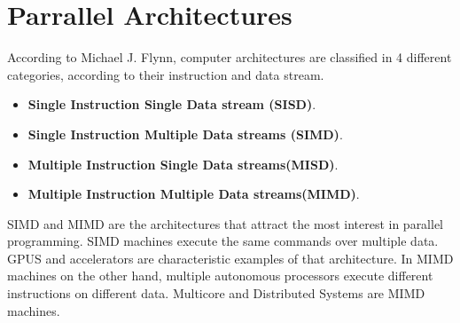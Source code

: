 \section{Parrallel Architectures}
According to Michael J. Flynn, computer architectures are classified in 4 different categories, according to their instruction and data stream. 


\begin{itemize}
	\item
	\textbf{Single Instruction Single Data stream (SISD)}. 

	\item
	\textbf{Single Instruction Multiple Data streams (SIMD)}.

	\item
	\textbf{Multiple Instruction Single Data streams(MISD)}.
	
	\item
	\textbf{Multiple Instruction Multiple Data streams(MIMD)}.



\end{itemize}

SIMD and MIMD are the architectures that attract the most interest in parallel programming. SIMD machines execute the same commands over multiple data. GPUS and accelerators are  characteristic examples of that architecture. In MIMD machines on the other hand, multiple autonomous processors execute different instructions on different data. Multicore and Distributed Systems are MIMD machines. 


